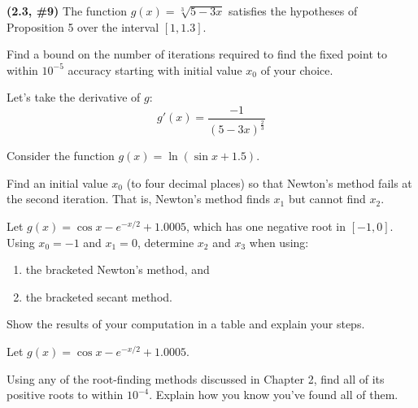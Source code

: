 \documentclass{eh-homework}
\begin{document}
    \newpage
    \begin{question}{2}
    \textbf{(2.3, \#9)} The function \(g(x) = \sqrt[3]{5 - 3x}\) satisfies the hypotheses of Proposition 5 over the interval \([1, 1.3]\).
    
    Find a bound on the number of iterations required to find the fixed point to within \(10^{-5}\) accuracy starting with initial value \(x_0\) of your choice.

    Let's take the derivative of \(g\):
    \[
        g'(x) = \frac{-1}{(5-3x)^{\frac{2}{3}}}
    \]
    \end{question}
    
    \begin{question}{3}
    Consider the function \(g(x) = \ln(\sin x + 1.5)\).
    
    Find an initial value \(x_0\) (to four decimal places) so that Newton’s method fails at the second iteration. That is, Newton’s method finds \(x_1\) but cannot find \(x_2\).
    \end{question}
    
    \begin{question}{4}
    Let \(g(x) = \cos x - e^{-x/2} + 1.0005\), which has one negative root in \([-1, 0]\). Using \(x_0 = -1\) and \(x_1 = 0\), determine \(x_2\) and \(x_3\) when using:
    
    \begin{enumerate}[label=\alph*.]
        \item the bracketed Newton’s method, and
        \item the bracketed secant method.
    \end{enumerate}
    
    Show the results of your computation in a table and explain your steps.
    \end{question}
    
    \begin{question}{5}
    Let \(g(x) = \cos x - e^{-x/2} + 1.0005\).
    
    Using any of the root-finding methods discussed in Chapter 2, find all of its positive roots to within \(10^{-4}\). Explain how you know you’ve found all of them.
    \end{question}
    
\end{document}
